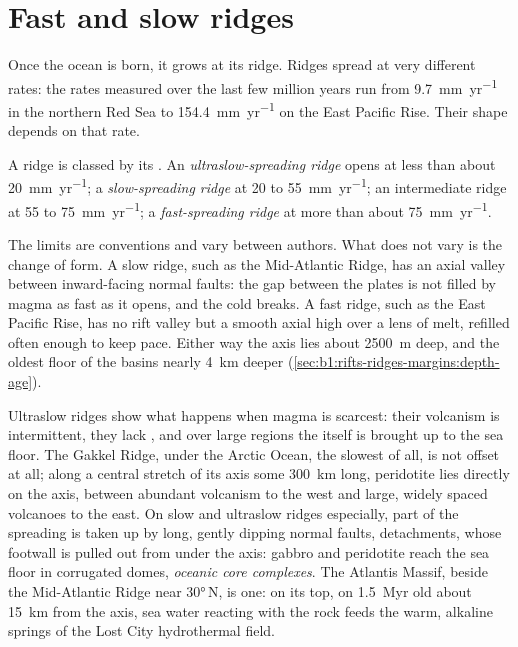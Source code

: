 \section{Fast and slow ridges}

Once the ocean is born, it grows at its ridge. Ridges spread at very different
rates: the rates measured over the last few million years run from
\qty{9.7}{mm.yr^{-1}} in the northern Red Sea to \qty{154.4}{mm.yr^{-1}} on
the East Pacific Rise. Their shape depends on that rate.

\begin{definition}\label{def:b1:rifts-ridges-margins:ridge-classes}
A ridge is classed by its . An
\emph{ultraslow-spreading ridge} opens at
less than about \qty{20}{mm.yr^{-1}}; a \emph{slow-spreading
ridge} at 20 to \qty{55}{mm.yr^{-1}}; an
intermediate ridge at 55 to \qty{75}{mm.yr^{-1}}; a \emph{fast-spreading
ridge} at more than about
\qty{75}{mm.yr^{-1}}.
\end{definition}

The limits are conventions and vary between authors. What does not vary is the
change of form. A slow ridge, such as the Mid-Atlantic Ridge, has
an axial valley between inward-facing normal faults: the gap between the
plates is not filled by magma as fast as it opens, and the cold 
breaks. A fast ridge, such as the East Pacific Rise, has no rift valley but a
smooth axial high over a lens of melt, refilled often enough to keep pace.
Either way the axis lies about \qty{2500}{m} deep, and the oldest floor of the
basins nearly \qty{4}{km} deeper (\cref{sec:b1:rifts-ridges-margins:depth-age}).

Ultraslow ridges show what happens when magma is scarcest: their volcanism is
intermittent, they lack , and over large regions the 
itself is brought up to the sea floor. The Gakkel Ridge, under the Arctic
Ocean, the slowest of all, is not offset at all; along a central stretch of
its axis some \qty{300}{km} long,  peridotite lies directly on the axis,
between abundant volcanism to the west and large, widely spaced volcanoes to
the east. On slow and ultraslow ridges especially, part of the spreading is
taken up by long, gently dipping normal faults, detachments, whose footwall is
pulled out from under the axis: gabbro and peridotite reach the sea floor in
corrugated domes, \emph{oceanic core complexes}. The Atlantis Massif, beside
the Mid-Atlantic Ridge near \ang{30}\,N, is one: on its top, on 
\qty{1.5}{Myr} old about \qty{15}{km} from the axis, sea water reacting with
the  rock feeds the warm, alkaline springs of the Lost City
hydrothermal field.

